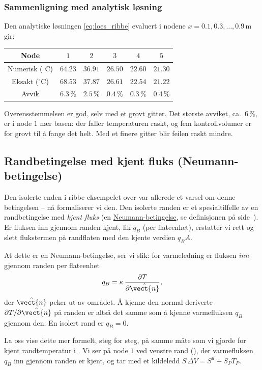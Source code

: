 \subsubsection*{Sammenligning med analytisk løsning}

Den analytiske løsningen \eqref{eq:loes_ribbe} evaluert i nodene $x=0.1, 0.3, \ldots, 0.9\,\text{m}$ gir:
\begin{center}
\begin{tabular}{|c|c|c|c|c|c|}
\hline
Node & $1$ & $2$ & $3$ & $4$ & $5$ \\
\hline
Numerisk ($^\circ$C) & $64.23$ & $36.91$ & $26.50$ & $22.60$ & $21.30$ \\
Eksakt ($^\circ$C) & $68.53$ & $37.87$ & $26.61$ & $22.54$ & $21.22$ \\
Avvik & $6.3\,\%$ & $2.5\,\%$ & $0.4\,\%$ & $0.3\,\%$ & $0.4\,\%$ \\
\hline
\end{tabular}
\end{center}
Overensstemmelsen er god, selv med et grovt gitter. Det største avviket, ca.\ $6\,\%$, er i node $1$ nær basen: der faller temperaturen raskt, og fem kontrollvolumer er for grovt til å fange det helt. Med et finere gitter blir feilen raskt mindre.

\subsection{Randbetingelse med kjent fluks (Neumann-betingelse)}\label{sect:evm_neumann}
Den isolerte enden i ribbe-eksempelet over var allerede et varsel om denne betingelsen -- nå formaliserer vi den. Den isolerte randen er et spesialtilfelle av en randbetingelse med \emph{kjent fluks} (en \hyperref[def:neumann]{Neumann-betingelse}, se definisjonen på side~\pageref{def:neumann}). Er fluksen inn gjennom randen kjent, lik $q_B$ (per flateenhet), erstatter vi rett og slett flukstermen på randflaten med den kjente verdien $q_B A$.

At dette er en Neumann-betingelse, ser vi slik: for varmeledning er fluksen \emph{inn} gjennom randen per flateenhet
\[
q_B = \kappa\,\frac{\partial T}{\partial \hat{\vect{n}}},
\]
der $\hat{\vect{n}}$ peker ut av området. Å kjenne den normal-deriverte $\partial T/\partial\hat{\vect{n}}$ på randen er altså det samme som å kjenne varmefluksen $q_B$ gjennom den. En isolert rand er $q_B = 0$.

La oss vise dette mer formelt, steg for steg, på samme måte som vi gjorde for kjent randtemperatur i . Vi ser på node $1$ ved venstre rand (), der varmefluksen $q_B$ inn gjennom randen er kjent, og tar med et kildeledd $\overline S\,\Delta V = S^u + S_P T_P$.

